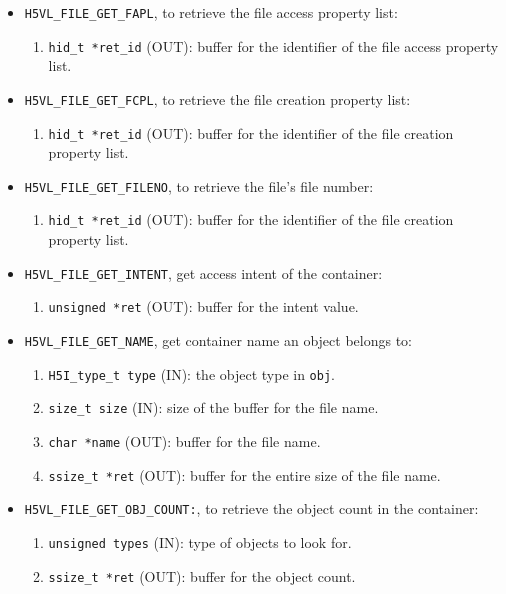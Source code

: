 \begin{mdframed}[style=bgbox]
\begin{itemize}
\item \texttt{H5VL\_FILE\_GET\_FAPL}, to retrieve the file access
  property list:
  \begin{enumerate}
  \item \texttt{hid\_t *ret\_id} (OUT): buffer for the identifier of the
    file access property list.
  \end{enumerate}

\item \texttt{H5VL\_FILE\_GET\_FCPL}, to retrieve the file creation
  property list:
  \begin{enumerate}
  \item \texttt{hid\_t *ret\_id} (OUT): buffer for the identifier of the
    file creation property list.
  \end{enumerate}

\item \texttt{H5VL\_FILE\_GET\_FILENO}, to retrieve the file's file number:
  \begin{enumerate}
  \item \texttt{hid\_t *ret\_id} (OUT): buffer for the identifier of the
    file creation property list.
  \end{enumerate}

\item \texttt{H5VL\_FILE\_GET\_INTENT}, get access intent of the
  container:
  \begin{enumerate}
  \item \texttt{unsigned *ret} (OUT): buffer for the intent value.
  \end{enumerate}

\item \texttt{H5VL\_FILE\_GET\_NAME}, get container name an object
  belongs to:
  \begin{enumerate}
  \item \texttt{H5I\_type\_t type} (IN): the object type in \texttt{obj}.
  \item \texttt{size\_t size} (IN): size of the buffer for the file name.
  \item \texttt{char *name} (OUT): buffer for the file name.
  \item \texttt{ssize\_t *ret} (OUT): buffer for the entire size of the
    file name.
  \end{enumerate}

\item \texttt{H5VL\_FILE\_GET\_OBJ\_COUNT:}, to retrieve the object count
  in the container:
  \begin{enumerate}
  \item \texttt{unsigned types} (IN): type of objects to look for.
  \item \texttt{ssize\_t *ret} (OUT): buffer for the object count.
  \end{enumerate}


\end{itemize}
\end{mdframed}
